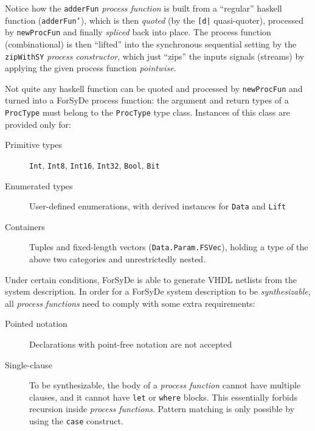 
            Notice how the \texttt{adderFun} \emph{process function} is built from a ``regular'' haskell function
            (\texttt{adderFun'}), which is then \emph{quoted} (by the \texttt{[d|} quasi-quoter), processed by
            \texttt{newProcFun} and finally \emph{spliced} back into place.
            The process function (combinational) is then ``lifted'' into the synchronous sequential setting
            by the \texttt{zipWithSY} \emph{process constructor}, which just ``zips'' the inputs signals (streams)
            by applying the given process function \emph{pointwise}.

            Not quite any haskell function can be quoted and processed by \texttt{newProcFun}
            and turned into a ForSyDe process function: the argument and return types of a \texttt{ProcType}
            must belong to the \texttt{ProcType} type class. Instances of this class are provided only for:

            \begin{description}
                \item[Primitive types] \texttt{Int}, \texttt{Int8}, \texttt{Int16}, \texttt{Int32}, \texttt{Bool}, \texttt{Bit}
                \item[Enumerated types] User-defined enumerations, with derived instances for \texttt{Data} and \texttt{Lift}
                \item[Containers] Tuples and fixed-length vectors (\texttt{Data.Param.FSVec}),
                    holding a type of the above two categories and unrestrictedly nested.
            \end{description}

            Under certain conditions, ForSyDe is able to generate \ac{VHDL} netlists from the system description.
            In order for a ForSyDe system description to be \emph{synthesizable},
            all \emph{process functions} need to comply with some extra requirements:

            \begin{description}
                \item[Pointed notation] Declarations with point-free notation are not accepted
                \item[Single-clause] To be synthesizable,
                    the body of a \emph{process function} cannot have multiple clauses,
                    and it cannot have \texttt{let} or \texttt{where} blocks.
                    This essentially forbids recursion inside \emph{process functions}.
                    Pattern matching is only possible by using the \texttt{case} construct.
            \end{description}

